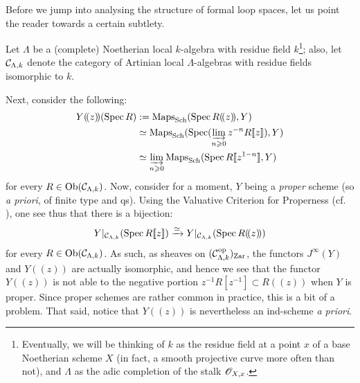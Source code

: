         Before we jump into analysing the structure of formal loop spaces, let us point the reader towards a certain subtlety.
        
        Let $\Lambda$ be a (complete) Noetherian local $k$-algebra with residue field $k$\footnote{Eventually, we will be thinking of $k$ as the residue field at a point $x$ of a base Noetherian scheme $X$ (in fact, a smooth projective curve more often than not), and $\Lambda$ as the adic completion of the stalk $\mathscr{O}_{X, x}$.}; also, let $\mathcal{C}_{\Lambda, k}$ denote the category of Artinian local $\Lambda$-algebras with residue fields isomorphic to $k$. 

        Next, consider the following:
            $$
                \begin{aligned}
                    Y(\!(z)\!)(\Spec R) & := \Maps_{\Sch}(\Spec R(\!(z)\!), Y)
                    \\
                    & \cong \Maps_{\Sch}(\Spec( \indlim_{n \geq 0} z^{-n} R[\![z]\!] ), Y)
                    \\
                    & \cong \indlim_{n \geq 0} \Maps_{\Sch}( \Spec R[\![z^{1 - n}]\!], Y )
                \end{aligned}
            $$
        for every $R \in \mathrm{Ob}( \mathcal{C}_{\Lambda, k} )$. Now, consider for a moment, $Y$ being a \textit{proper} scheme (so \textit{a priori}, of finite type and qs). Using the Valuative Criterion for Properness (cf. \cite[\href{https://stacks.math.columbia.edu/tag/0BX5}{Tag 0BX5}]{stacks}), one see thus that there is a bijection:
            $$Y|_{\mathcal{C}_{\Lambda, k}}( \operatorname{Spec} R[\![z]\!] ) \xrightarrow[]{\simeq} Y|_{\mathcal{C}_{\Lambda, k}}( \operatorname{Spec} R(\!(z)\!) )$$
        for every $R \in \mathrm{Ob}( \mathcal{C}_{\Lambda, k} )$. As such, as sheaves on $(\mathcal{C}_{\Lambda, k}^{\mathrm{op}})_{\mathrm{Zar}}$, the functors $J^{\infty}(Y)$ and $Y(\!(z)\!)$ are actually isomorphic, and hence we see that the functor $Y(\!(z)\!)$ is not able to  the negative portion $z^{-1} R[z^{-1}] \subset R(\!(z)\!)$ when $Y$ is proper. Since proper schemes are rather common in practice, this is a bit of a problem. That said, notice that $Y(\!(z)\!)$ is nevertheless an ind-scheme \textit{a priori}.

